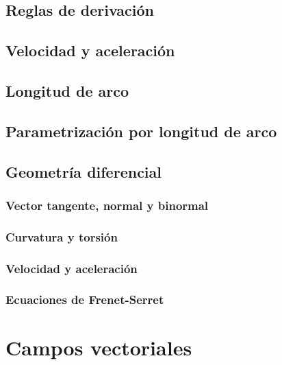 \documentclass[12pt, fleqn]{report}                             %
\begin{document}
            \subsection{Reglas de derivación}
            
            \subsection{Velocidad y aceleración}
        
            \subsection{Longitud de arco}
            
            \subsection{Parametrización por longitud de arco}
            
            \subsection{Geometría diferencial}
                
                \subsubsection{Vector tangente, normal y binormal}
                
                \subsubsection{Curvatura y torsión}
                
                \subsubsection{Velocidad y aceleración}
                
                \subsubsection{Ecuaciones de Frenet-Serret}
            
        \section{Campos vectoriales}
        
\end{document}
